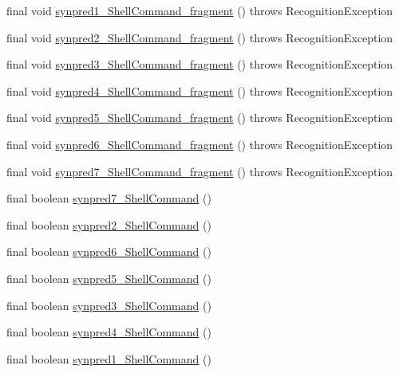 \begin{DoxyCompactItemize}
\item 
final void \hyperlink{classorg_1_1tzi_1_1use_1_1parser_1_1shell_1_1_shell_command_parser_a8568e797a91bc1703bcb773d7979304e}{synpred1\-\_\-\-Shell\-Command\-\_\-fragment} ()  throws Recognition\-Exception 
\item 
final void \hyperlink{classorg_1_1tzi_1_1use_1_1parser_1_1shell_1_1_shell_command_parser_a7e594fb1190bedb7c90294a9a4c40186}{synpred2\-\_\-\-Shell\-Command\-\_\-fragment} ()  throws Recognition\-Exception 
\item 
final void \hyperlink{classorg_1_1tzi_1_1use_1_1parser_1_1shell_1_1_shell_command_parser_ac0968dc29c79a582c09c3d5c6b1a8058}{synpred3\-\_\-\-Shell\-Command\-\_\-fragment} ()  throws Recognition\-Exception 
\item 
final void \hyperlink{classorg_1_1tzi_1_1use_1_1parser_1_1shell_1_1_shell_command_parser_a6da526f8612b91dbcd64833a139f8431}{synpred4\-\_\-\-Shell\-Command\-\_\-fragment} ()  throws Recognition\-Exception 
\item 
final void \hyperlink{classorg_1_1tzi_1_1use_1_1parser_1_1shell_1_1_shell_command_parser_acb93115345190e990acd37c8116f7b69}{synpred5\-\_\-\-Shell\-Command\-\_\-fragment} ()  throws Recognition\-Exception 
\item 
final void \hyperlink{classorg_1_1tzi_1_1use_1_1parser_1_1shell_1_1_shell_command_parser_af82df88890ac7491a386287de870eb23}{synpred6\-\_\-\-Shell\-Command\-\_\-fragment} ()  throws Recognition\-Exception 
\item 
final void \hyperlink{classorg_1_1tzi_1_1use_1_1parser_1_1shell_1_1_shell_command_parser_a823bd9fadb55338a71ca42190c6bdea4}{synpred7\-\_\-\-Shell\-Command\-\_\-fragment} ()  throws Recognition\-Exception 
\item 
final boolean \hyperlink{classorg_1_1tzi_1_1use_1_1parser_1_1shell_1_1_shell_command_parser_a7d45ce197fe781a8ca58a7d2d98b6a2c}{synpred7\-\_\-\-Shell\-Command} ()
\item 
final boolean \hyperlink{classorg_1_1tzi_1_1use_1_1parser_1_1shell_1_1_shell_command_parser_a0e896b6ce9292a7d93171bbbd149a685}{synpred2\-\_\-\-Shell\-Command} ()
\item 
final boolean \hyperlink{classorg_1_1tzi_1_1use_1_1parser_1_1shell_1_1_shell_command_parser_a32d5433ebc3542b93286b9536b9b6099}{synpred6\-\_\-\-Shell\-Command} ()
\item 
final boolean \hyperlink{classorg_1_1tzi_1_1use_1_1parser_1_1shell_1_1_shell_command_parser_abdccfc4c28731151830b8b7a824ee550}{synpred5\-\_\-\-Shell\-Command} ()
\item 
final boolean \hyperlink{classorg_1_1tzi_1_1use_1_1parser_1_1shell_1_1_shell_command_parser_a2705d17b12a228bdf0853e6ebda6c1f6}{synpred3\-\_\-\-Shell\-Command} ()
\item 
final boolean \hyperlink{classorg_1_1tzi_1_1use_1_1parser_1_1shell_1_1_shell_command_parser_ad540fbbde8d9d92018ec3f6ded7116a8}{synpred4\-\_\-\-Shell\-Command} ()
\item 
final boolean \hyperlink{classorg_1_1tzi_1_1use_1_1parser_1_1shell_1_1_shell_command_parser_a66abb297b25f205898619c6a20493eae}{synpred1\-\_\-\-Shell\-Command} ()
\end{DoxyCompactItemize}
